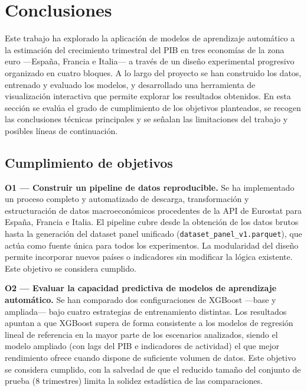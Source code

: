 
\chapter{Conclusiones}
\label{conclusiones}

Este trabajo ha explorado la aplicación de modelos de aprendizaje automático a la
estimación del crecimiento trimestral del PIB en tres economías de la zona euro ---España,
Francia e Italia--- a través de un diseño experimental progresivo organizado en cuatro
bloques. A lo largo del proyecto se han construido los datos, entrenado y evaluado los
modelos, y desarrollado una herramienta de visualización interactiva que permite explorar
los resultados obtenidos. En esta sección se evalúa el grado de cumplimiento de los
objetivos planteados, se recogen las conclusiones técnicas principales y se señalan las
limitaciones del trabajo y posibles líneas de continuación.

\section{Cumplimiento de objetivos}

\textbf{O1 — Construir un pipeline de datos reproducible.} Se ha implementado un proceso
completo y automatizado de descarga, transformación y estructuración de datos
macroeconómicos procedentes de la API de Eurostat para España, Francia e Italia. El
pipeline cubre desde la obtención de los datos brutos hasta la generación del dataset
panel unificado (\texttt{dataset\_panel\_v1.parquet}), que actúa como fuente única para
todos los experimentos. La modularidad del diseño permite incorporar nuevos países o
indicadores sin modificar la lógica existente. Este objetivo se considera cumplido.

\textbf{O2 — Evaluar la capacidad predictiva de modelos de aprendizaje automático.} Se
han comparado dos configuraciones de XGBoost ---base y ampliada--- bajo cuatro estrategias
de entrenamiento distintas. Los resultados apuntan a que XGBoost supera de forma
consistente a los modelos de regresión lineal de referencia en la mayor parte de los
escenarios analizados, siendo el modelo ampliado (con lags del PIB e indicadores de
actividad) el que mejor rendimiento ofrece cuando dispone de suficiente volumen de datos.
Este objetivo se considera cumplido, con la salvedad de que el reducido tamaño del
conjunto de prueba (8 trimestres) limita la solidez estadística de las comparaciones.

